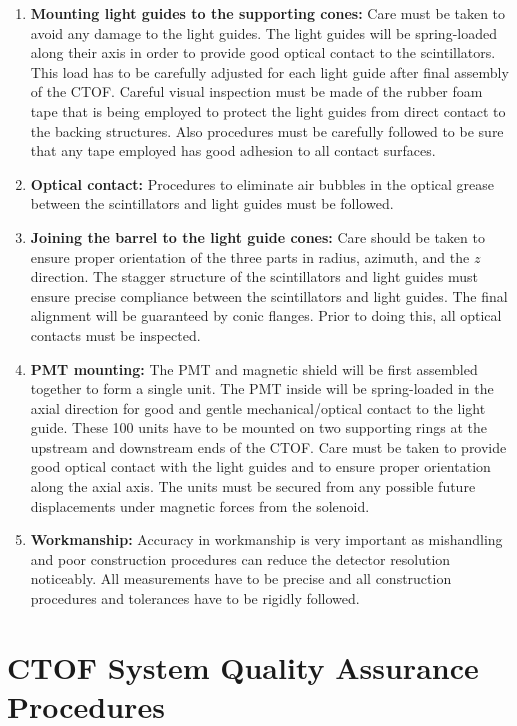 \begin{enumerate}
\item  \textbf{Mounting light guides to the supporting cones:} 
Care must be taken to avoid any damage to the light guides.  The light guides 
will be spring-loaded along their axis in order to provide good optical 
contact to the scintillators.  This load has to be carefully adjusted for 
each light guide after final assembly of the CTOF.  Careful visual inspection 
must be made of the rubber foam tape that is being employed to protect the 
light guides from direct contact to the backing structures.  Also
procedures must be carefully followed to be sure that any tape employed
has good adhesion to all contact surfaces.

\item \textbf{Optical contact:}
Procedures to eliminate air bubbles in the optical grease between 
the scintillators and light guides must be followed.

\item \textbf{Joining the barrel to the light guide cones:}
Care should be taken to ensure proper orientation of the three parts in 
radius, azimuth, and the $z$ direction.  The stagger structure of the 
scintillators and light guides must ensure precise compliance between the
scintillators and light guides.  The final alignment will be guaranteed by 
conic flanges.  Prior to doing this, all optical contacts must be inspected. 
  
\item \textbf{PMT mounting:}
The PMT and magnetic shield will be first assembled together to form a single 
unit.  The PMT inside will be spring-loaded in the axial direction for good 
and gentle mechanical/optical contact to the light guide.  These 100 units 
have to be mounted on two supporting rings at the upstream and downstream
ends of the CTOF.  Care must be taken to provide good optical contact with 
the light guides and to ensure proper orientation along the axial axis.
The units must be secured from any possible future displacements under 
magnetic forces from the solenoid.

\item \textbf{Workmanship:} 
Accuracy in workmanship is very important as mishandling and poor 
construction procedures can reduce the detector resolution noticeably.  All 
measurements have to be precise and all construction procedures and 
tolerances have to be rigidly followed.

\end{enumerate}

\section{CTOF System Quality Assurance Procedures}

